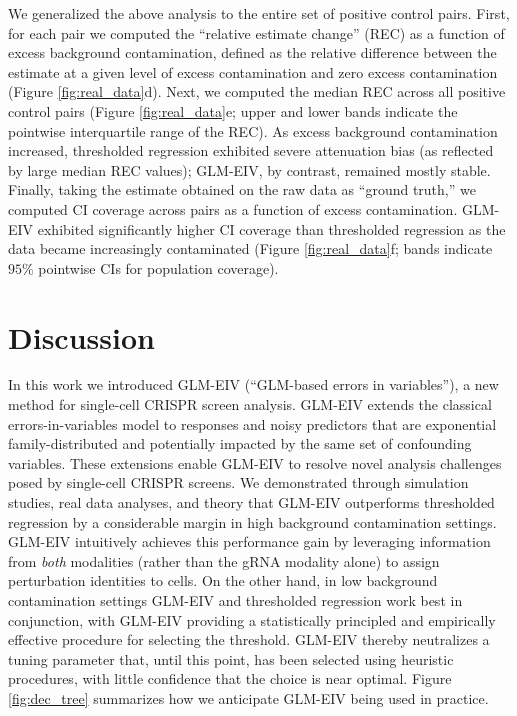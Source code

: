 \documentclass[12pt]{article}
\begin{document}
We generalized the above analysis to the entire set of positive control pairs. First, for each pair we computed the ``relative estimate change'' (REC) as a function of excess background contamination, defined as the relative difference between the estimate at a given level of excess contamination and zero excess contamination (Figure \ref{fig:real_data}d). Next, we computed the median REC across all positive control pairs (Figure \ref{fig:real_data}e; upper and lower bands indicate the pointwise interquartile range of the REC). As excess background contamination increased, thresholded regression exhibited severe attenuation bias (as reflected by large median REC values); GLM-EIV, by contrast, remained mostly stable. Finally, taking the estimate obtained on the raw data as ``ground truth,'' we computed CI coverage across pairs as a function of excess contamination. GLM-EIV exhibited significantly higher CI coverage than thresholded regression as the data became increasingly contaminated (Figure \ref{fig:real_data}f; bands indicate $95\%$ pointwise CIs for population coverage). 

\section{Discussion}

In this work we introduced GLM-EIV (``GLM-based errors in variables''), a new method for single-cell CRISPR screen analysis. GLM-EIV extends the classical errors-in-variables model to responses and noisy predictors that are exponential family-distributed and potentially impacted by the same set of confounding variables. These extensions enable GLM-EIV to resolve novel analysis challenges posed by single-cell CRISPR screens. We demonstrated through simulation studies, real data analyses, and theory that GLM-EIV outperforms thresholded regression by a considerable margin in high background contamination settings. GLM-EIV intuitively achieves this performance gain by leveraging information from \textit{both} modalities (rather than the gRNA modality alone) to assign perturbation identities to cells. On the other hand, in low background contamination settings GLM-EIV and thresholded regression work best in conjunction, with GLM-EIV providing a statistically principled and empirically effective procedure for selecting the threshold. GLM-EIV thereby neutralizes a tuning parameter that, until this point, has been selected using heuristic procedures, with little confidence that the choice is near optimal. Figure \ref{fig:dec_tree} summarizes how we anticipate GLM-EIV being used in practice.
\end{document}

